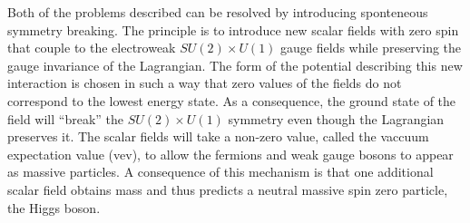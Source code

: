 Both of the problems described can be resolved by introducing 
sponteneous symmetry breaking. The principle is to introduce new scalar fields with 
zero spin that couple to the electroweak  $ SU\left(2\right) \times U\left(1\right) $
gauge fields while preserving the gauge invariance of the Lagrangian.
The form of the potential describing this new interaction is chosen in such a way that 
zero values of the fields do not correspond to the lowest energy state.
As a consequence, the ground state of the field will ``break'' the  
$ SU\left(2\right) \times U\left(1\right) $ symmetry 
even though the Lagrangian preserves it.
The scalar fields will take a non-zero value, called the vaccuum expectation value 
(vev), to allow the fermions and weak gauge bosons to appear as massive particles.
A consequence of this mechanism is that one additional scalar field obtains mass
and thus predicts a neutral massive spin zero particle, the Higgs boson. 

